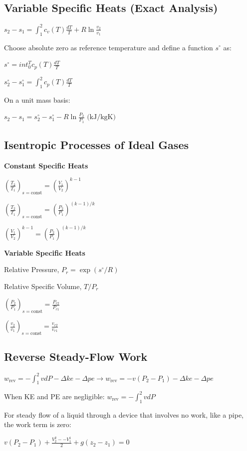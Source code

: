 \documentclass{article}
\begin{document}
\begin{multicols}{3}
    \subsection*{Variable Specific Heats (Exact Analysis)}
    $s_2-s_1=\int_1^2c_v(T)\frac{dT}{T}+R\ln{\frac{v_2}{v_1}}$\par 
    Choose absolute zero as reference temperature and define a function $s^\circ$ as:\par 
    $s^\circ=int_0^Tc_p(T)\frac{dT}{T}$\par 
    $s_2^\circ-s_1^\circ=\int_1^2c_p(T)\frac{dT}{T}$\par 
    On a unit mass basis: \par 
    $s_2-s_1=s_2^\circ-s_1^\circ-R\ln\frac{P_2}{P_1}\text{ (kJ/kgK)}$\par 
    \subsection*{Isentropic Processes of Ideal Gases}
    \textbf{Constant Specific Heats}\par
    $\left(\frac{T_2}{T_1}\right)_{s=\text{const}}=\left(\frac{V_1}{V_2}\right)^{k-1}$\par 
    $\left(\frac{T_2}{T_1}\right)_{s=\text{const}}=\left(\frac{P_2}{P_1}\right)^{(k-1)/k}$\par 
    $\left(\frac{V_1}{V_2}\right)^{k-1}=\left(\frac{P_2}{P_1}\right)^{(k-1)/k}$\par
    \textbf{Variable Specific Heats}\par 
    Relative Pressure, $P_r = \exp{(s^\circ/R)}$\par 
    Relative Specific Volume, $T/P_r$\par 
    $\left(\frac{P_2}{P_1}\right)_{s=\text{const}} = \frac{P_{r2}}{P_{r1}}$\par 
    $\left(\frac{v_2}{v_1}\right)_{s=\text{const}} = \frac{v_{r2}}{v_{r1}}$\par
    \subsection*{Reverse Steady-Flow Work}
    $w_\text{rev}=-\int_1^2 vdP-\Delta ke-\Delta pe\rightarrow w_\text{rev}=-v(P_2-P_1)-\Delta ke-\Delta pe$\par 
    When KE and PE are negligible: $w_\text{rev}=-\int_1^2 vdP$\par 
    For steady flow of a liquid through a device that involves no work, like a pipe, the work term is zero:\par 
    $v(P_2-P_1)+\frac{V_2^2--V_1^1}{2}+g(z_2-z_1)=0$


\end{multicols}
\end{document}

